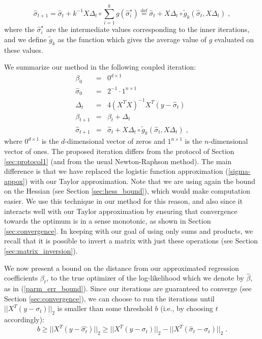\documentclass[11pt]{article}
\begin{document}
\begin{equation}\label{sigma_approx_k}
\hat{\sigma}_{t+1} = \hat{\sigma}_t + k^{-1}X\Delta_t \circ \sum_{i=1}^k g(\hat{\sigma}_i^\star) \stackrel{\text{def}}{=} \hat{\sigma}_t + X\Delta_t \circ \tilde{g}_k(\hat{\sigma}_t, X\Delta_t) \; ,
\end{equation}
where the $\hat{\sigma}_i^\star$ are the intermediate values corresponding to the inner iterations, and we define $\tilde{g}_k$ as the function which gives the average value of $g$ evaluated on these values.

We summarize our method  in the following coupled iteration:
\begin{eqnarray}
\beta_0 &=& 0^{d\times 1} \nonumber\\\nonumber
\hat{\sigma}_{0} &=& 2^{-1}\cdot 1^{n\times 1} \\
\Delta_t &=& 4(X^TX)^{-1}X^T(y-\hat{\sigma}_{t}) \label{eq:coupled}  \\  \nonumber
\beta_{t+1} &=& \beta_t + \Delta_t \\ \nonumber
\hat{\sigma}_{t+1} &=& \hat{\sigma}_{t} + X\Delta_t \circ \tilde{g}_k(\hat{\sigma}_t, X\Delta_t) \; , \nonumber
\end{eqnarray}
where $0^{d\times 1}$ is the $d$-dimensional vector of zeros and $1^{n\times 1}$ is the $n$-dimensional vector of ones.
The proposed iteration differs from the protocol of Section \ref{sec:protocol1} (and from the usual Newton-Raphson method).  The main difference is that we have replaced the logistic function approximation (\ref{sigma-appox}) with our Taylor approximation. Note that we are using again the bound on the Hessian (see Section \ref{sec:hess_bound}), which would make computation easier. We use this technique in our method for this reason, and also since it interacts well with our Taylor approximation by ensuring that convergence towards the optimum is in a sense monotonic, as shown in Section \ref{sec:convergence}.  In keeping with our goal of using only sums and products, we recall that it is possible to invert a matrix with just these operations (see Section \ref{sec:matrix_inversion}).



We now present a bound on the distance from our approximated regression coefficients $\beta_t$, to the true optimizer of the log-likelihood which we denote by $\hat\beta$, as in (\ref{parm_err_bound}).
Since our iterations are guaranteed to converge (see Section \ref{sec:convergence}), we can choose to run the iterations until $||X^T(y-\sigma_t)||_2$ is smaller than some threshold $b$ (i.e., by choosing $t$ accordingly):
\[ b  \geq ||X^T(y-\hat{\sigma_t})||_2  \geq ||X^T(y-\sigma_t)||_2 - ||X^T(\hat{\sigma}_t - \sigma_t)||_2  \; .
\]
\end{document}

